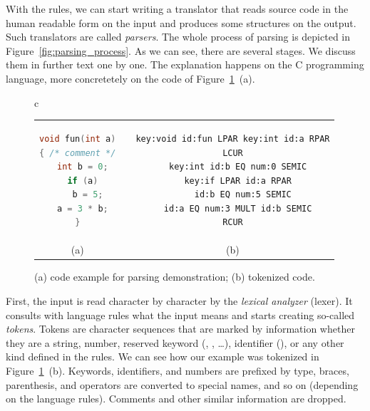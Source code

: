With the rules, we can start writing a translator that reads source code in
the human readable form on the input and produces some structures on the
output. Such translators are called \emph{parsers}.  The whole process of
parsing is depicted in Figure~\ref{fig:parsing_process}.  As we can see, there
are several stages. We discuss them in further text one by one.  The
explanation happens on the C programming language, more concretetely on the
code of Figure~\ref{fig:intro_parsing_codes}~(a).

\begin{figure}[htb]
\begin{center}
\begin{tabular}{c}
    \begin{tabular}{ccc}
    \begin{lstlisting}[language=C]
void fun(int a)
{ /* comment */
  int b = 0;
  if (a)
    b = 5;
  a = 3 * b;
}
    \end{lstlisting} & & {
    \begin{lstlisting}[numbers=none]
key:void id:fun LPAR key:int id:a RPAR
LCUR
  key:int id:b EQ num:0 SEMIC
  key:if LPAR id:a RPAR
    id:b EQ num:5 SEMIC
  id:a EQ num:3 MULT id:b SEMIC
RCUR
    \end{lstlisting} } \\
    (a) & & (b)
    \end{tabular}
\end{tabular}
\end{center}
    \caption{(a) code example for parsing demonstration; (b) tokenized code.}
  \label{fig:intro_parsing_codes}
\end{figure}


First, the input is read character by character by the \emph{lexical analyzer}
(lexer).  It consults with language rules what the input means and starts
creating so-called \emph{tokens}. Tokens are character sequences that are
marked by information whether they are a string, number, reserved keyword
(, , \dots), identifier (), or any
other kind defined in the rules. We can see how our example was tokenized in
Figure~\ref{fig:intro_parsing_codes}~(b).  Keywords, identifiers, and numbers
are prefixed by type, braces, parenthesis, and operators are converted to
special names, and so on (depending on the language rules). Comments and other
similar information are dropped.

